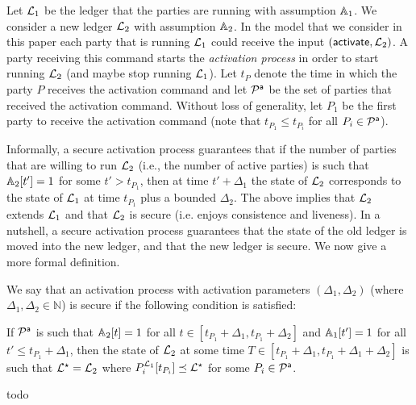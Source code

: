 Let $\mathcal{L}_1$ be the ledger that the parties are running with assumption $\mathbb{A}_1$. We consider a new ledger $\mathcal{L}_2$ with assumption $\mathbb{A}_2$.
In the model that we consider in this paper each party that is running $\mathcal{L}_1$ could receive the input $(\mathsf{activate}, \mathcal{L}_2)$. A party receiving this command starts the \emph{activation process}
in order to start running $\mathcal{L}_2$ (and maybe stop running $\mathcal{L}_1$). Let $t_P$ denote the time in which 
the party $P$ receives the activation command and let $\mathcal{P}^\mathsf{a}$ be the set of parties that received the activation command. Without loss of generality, let $P_1$ be the first party to receive the activation command (note that $t_{P_1}\leq t_{P_i}$ for all $P_i\in\mathcal{P}^\mathsf{a}$).

Informally, a secure activation process guarantees that if the number of parties that are willing to run $\mathcal{L}_2$ (i.e., the number of active parties)  
is such that $\mathbb{A}_2[t']=1$ for some $t'>t_{P_1}$, then at time $t'+\Delta_1$ the state of $\mathcal{L}_2$ corresponds to the state of $\mathcal{L}_1$ at time $t_{P_1}$ plus
a bounded $\Delta_2$. 
The above implies that $\mathcal{L}_2$ extends $\mathcal{L}_1$ and that $\mathcal{L}_2$ is secure (i.e. enjoys consistence and liveness).
In a nutshell, a secure activation process guarantees that the state of the old ledger is moved into the new ledger, and that the new ledger is secure.
We now give a more formal definition.

\begin{definition}
 We say that an activation process with activation parameters $(\Delta_1,\Delta_2)$ (where $\Delta_1,\Delta_2\in\mathbb{N}$) is secure if the following condition is satisfied:

If $\mathcal{P}^\mathsf{a}$ is such that $\mathbb{A}_2[t]=1$ for all $t\in [t_{P_1}+\Delta_1, t_{P_1}+\Delta_2]$ %
	and $\mathbb{A}_1[t']=1$ for all $t' \leq t_{P_1}+\Delta_1$, then the state of $\mathcal{L}_2$ at some time $T\in [t_{P_1}+\Delta_1, t_{P_1}+\Delta_1+\Delta_2]$ is such that $\mathcal{L}^\star=\mathcal{L}_2$
	where $  P_i^{\mathcal{L}_1}[t_{P_i}] \preceq \mathcal{L}^\star$ for some $P_i\in\mathcal{P}^\mathsf{a}$.  
\end{definition}

\begin{definition}\label{def:genesis}
todo
\end{definition}

